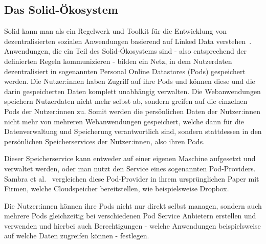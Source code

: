 \documentclass[acmtog]{acmart}
\begin{document}
\subsection{Das Solid-Ökosystem}\label{subsection:solideco}


Solid kann man als ein Regelwerk und Toolkit für die Entwicklung von dezentralisierten sozialen Anwendungen basierend auf Linked Data verstehen~\cite{ramachandran2020towards}. Anwendungen, die ein Teil des Solid-Ökosystems sind - also entsprechend der definierten Regeln kommunizieren - bilden ein Netz, in dem Nutzerdaten dezentralisiert in sogenannten Personal Online Datastores (Pods) gespeichert werden. Die Nutzer:innen haben Zugriff auf ihre Pods und können diese und die darin gespeicherten Daten komplett unabhängig verwalten. Die Webanwendungen speichern Nutzerdaten nicht mehr selbst ab, sondern greifen auf die einzelnen Pods der Nutzer:innen zu. Somit werden die persönlichen Daten der Nutzer:innen nicht mehr von mehreren Webanwendungen gespeichert, welche dann für die Datenverwaltung und Speicherung verantwortlich sind, sondern stattdessen in den persönlichen Speicherservices der Nutzer:innen, also ihren Pods.


Dieser Speicherservice kann entweder auf einer eigenen Maschine aufgesetzt und verwaltet werden, oder man nutzt den Service eines sogenannten Pod-Providers. Sambra et al.~\cite{sambra2016solid} vergleichen diese Pod-Provider in ihrem ursprünglichen Paper mit Firmen, welche Cloudspeicher bereitstellen, wie beispielsweise Dropbox.

Die Nutzer:innen können ihre Pods nicht nur direkt selbst managen, sondern auch mehrere Pods gleichzeitig bei verschiedenen Pod Service Anbietern erstellen und verwenden und hierbei auch Berechtigungen - welche Anwendungen beispielsweise auf welche Daten zugreifen können - festlegen.
\end{document}

